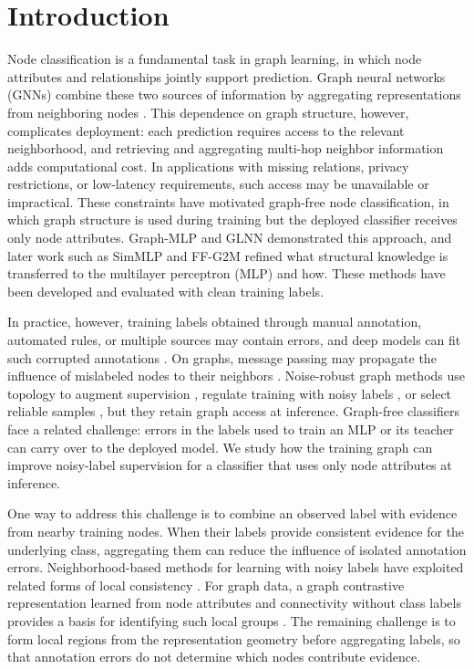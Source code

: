 \documentclass[10pt,letterpaper,nopreprintline]{elsarticle}
\theoremstyle{definition}
\theoremstyle{plain}
\begin{document}
\section{Introduction}\label{sec:1}

Node classification is a fundamental task in graph learning, in which node attributes and relationships jointly support prediction. Graph neural networks (GNNs) combine these two sources of information by aggregating representations from neighboring nodes \cite{ref1,ref2}. This dependence on graph structure, however, complicates deployment: each prediction requires access to the relevant neighborhood, and retrieving and aggregating multi-hop neighbor information adds computational cost. In applications with missing relations, privacy restrictions, or low-latency requirements, such access may be unavailable or impractical. These constraints have motivated graph-free node classification, in which graph structure is used during training but the deployed classifier receives only node attributes. Graph-MLP \cite{ref3} and GLNN \cite{ref4} demonstrated this approach, and later work such as SimMLP \cite{ref41} and FF-G2M \cite{ref45} refined what structural knowledge is transferred to the multilayer perceptron (MLP) and how. These methods have been developed and evaluated with clean training labels.

In practice, however, training labels obtained through manual annotation, automated rules, or multiple sources may contain errors, and deep models can fit such corrupted annotations \cite{ref5}. On graphs, message passing may propagate the influence of mislabeled nodes to their neighbors \cite{ref6}. Noise-robust graph methods use topology to augment supervision \cite{ref7}, regulate training with noisy labels \cite{ref8}, or select reliable samples \cite{ref9}, but they retain graph access at inference. Graph-free classifiers face a related challenge: errors in the labels used to train an MLP or its teacher can carry over to the deployed model. We study how the training graph can improve noisy-label supervision for a classifier that uses only node attributes at inference.

One way to address this challenge is to combine an observed label with evidence from nearby training nodes. When their labels provide consistent evidence for the underlying class, aggregating them can reduce the influence of isolated annotation errors. Neighborhood-based methods for learning with noisy labels have exploited related forms of local consistency \cite{ref10,ref11}. For graph data, a graph contrastive representation learned from node attributes and connectivity without class labels provides a basis for identifying such local groups \cite{ref12}. The remaining challenge is to form local regions from the representation geometry before aggregating labels, so that annotation errors do not determine which nodes contribute evidence.
\end{document}
